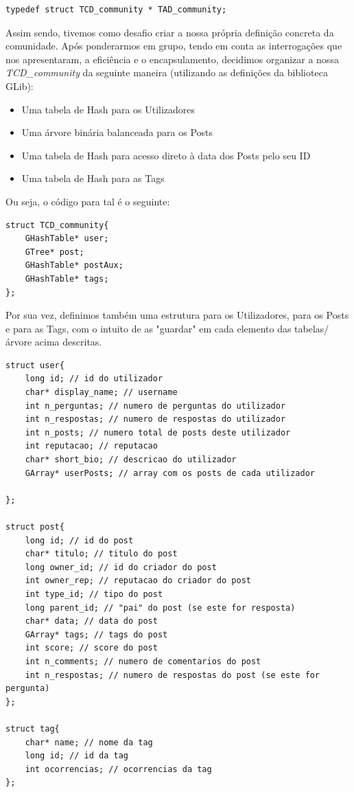 \documentclass[a4paper, 11pt, oneside]{article}
\begin{document}
\begin{lstlisting}[caption=Definição da TAD\_community]
typedef struct TCD_community * TAD_community;
\end{lstlisting}

Assim sendo, tivemos como desafio criar a nossa própria definição concreta da comunidade. Após ponderarmos em grupo, tendo em conta as interrogações que nos apresentaram, a eficiência e o encapsulamento, decidimos organizar a nossa \textit{TCD\_community} da seguinte maneira (utilizando as definições da biblioteca GLib):
\begin{itemize}
\item Uma tabela de Hash para os Utilizadores
\item Uma árvore binária balanceada para os Posts
\item Uma tabela de Hash para acesso direto à data dos Posts pelo seu ID
\item Uma tabela de Hash para as Tags
\end{itemize}

Ou seja, o código para tal é o seguinte:
\begin{lstlisting}[caption=Definição da TCD\_community]
struct TCD_community{
	GHashTable* user;
	GTree* post;
	GHashTable* postAux;
	GHashTable* tags;	
};
\end{lstlisting}

Por sua vez, definimos também uma estrutura para os Utilizadores, para os Posts e para as Tags, com o intuito de as "guardar" em cada elemento das tabelas/árvore acima descritas.

\begin{lstlisting}[caption=Definição de estruturas internas]
struct user{
	long id; // id do utilizador
	char* display_name; // username
	int n_perguntas; // numero de perguntas do utilizador
	int n_respostas; // numero de respostas do utilizador
	int n_posts; // numero total de posts deste utilizador
	int reputacao; // reputacao
	char* short_bio; // descricao do utilizador
	GArray* userPosts; // array com os posts de cada utilizador

};

struct post{
	long id; // id do post
	char* titulo; // titulo do post
	long owner_id; // id do criador do post
	int owner_rep; // reputacao do criador do post
	int type_id; // tipo do post
	long parent_id; // "pai" do post (se este for resposta)
	char* data; // data do post
	GArray* tags; // tags do post
	int score; // score do post
	int n_comments; // numero de comentarios do post
	int n_respostas; // numero de respostas do post (se este for pergunta)
};

struct tag{
	char* name; // nome da tag
	long id; // id da tag
	int ocorrencias; // ocorrencias da tag
};
\end{lstlisting}
\end{document}

